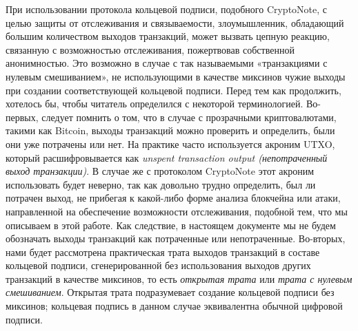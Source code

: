 \documentclass{mrl}
\begin{document}
При использовании протокола кольцевой подписи, подобного CryptoNote, с целью защиты от отслеживания и связываемости, злоумышленник, обладающий большим количеством выходов транзакций, может вызвать цепную реакцию, связанную с возможностью отслеживания, пожертвовав собственной анонимностью. Это возможно в случае с так называемыми «транзакциями с нулевым смешиванием», не использующими в качестве миксинов чужие выходы при создании соответствующей кольцевой подписи. Перед тем как продолжить, хотелось бы, чтобы читатель определился с некоторой терминологией. Во-первых, следует помнить о том, что в случае с прозрачными криптовалютами, такими как Bitcoin, выходы транзакций можно проверить и определить, были они уже потрачены или нет. На практике часто используется акроним UTXO, который расшифровывается как \textit{unspent transaction output (непотраченный выход транзакции)}. В случае же с протоколом CryptoNote этот акроним использовать будет неверно, так как довольно трудно определить, был ли потрачен выход, не прибегая к какой-либо форме анализа блокчейна или атаки, направленной на обеспечение возможности отслеживания, подобной тем, что мы описываем в этой работе. Как следствие, в настоящем документе мы не будем обозначать выходы транзакций как потраченные или непотраченные. Во-вторых, нами будет рассмотрена практическая трата выходов транзакций в составе кольцевой подписи, сгенерированной без использования выходов других транзакций в качестве миксинов, то есть \textit{открытая трата} или \textit{трата с нулевым смешиванием}. Открытая трата подразумевает создание кольцевой подписи без миксинов; кольцевая подпись в данном случае эквивалентна обычной цифровой подписи.
\end{document}
